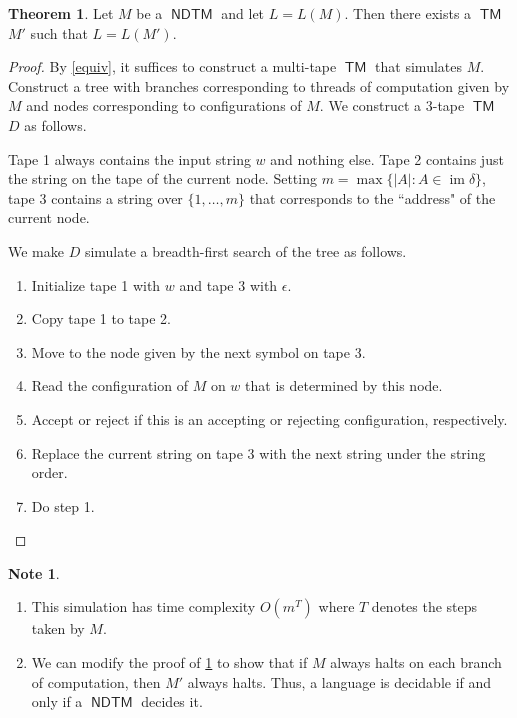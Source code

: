\documentclass[10pt,letterpaper,cm]{nupset}
\theoremstyle{definition}
\newtheorem{note}[definition]{Note}
\theoremstyle{theorem}
\newtheorem{theorem}[definition]{Theorem}
\theoremstyle{remark}
\newcommand{\1}{\mathbf{1}}
\newcommand{\0}{\vec 0}
\DeclareMathOperator{\im}{im}
\DeclareMathOperator{\TM}{\mathsf{TM}}
\DeclareMathOperator{\NDTM}{\mathsf{NDTM}}
\begin{document}
\begin{theorem}\label{LT}
Let $M$ be a $\NDTM$ and let $L = L(M)$. Then there exists a $\TM$ $M'$ such that $L= L(M')$. 
\end{theorem}
\begin{proof}
By \cref{equiv}, it suffices to construct a multi-tape $\TM$ that simulates $M$. Construct a tree with branches corresponding to threads of computation given by $M$ and nodes corresponding to configurations of $M$. We construct a $3$-tape $\TM$ $D$ as follows. 

\medskip

 Tape 1 always contains the input string $w$ and nothing else. Tape 2 contains just the string on the tape of the current node. Setting $m = \max\{ \lvert{A}\rvert : A \in \im{\delta} \}$, tape 3 contains a string over $\{1, \ldots, m\}$ that corresponds to the ``address" of the current node. 

\medskip

 We make $D$ simulate a breadth-first search of the tree as follows. 
\begin{enumerate}
\item Initialize  tape 1 with $w$ and tape $3$ with $\epsilon$. 
\item Copy tape 1 to tape 2.
\item Move to the node given by the next symbol on tape 3.
\item Read the configuration of $M$ on $w$ that is determined by this node.
\item Accept or reject if this is an accepting or rejecting configuration, respectively. 
\item Replace the current string on tape 3 with the next string under the string order.
\item Do step 1.
\end{enumerate}
\end{proof}

\begin{note} $ $
\begin{enumerate}
\item This simulation has time complexity $O(m^T)$ where $T$ denotes the steps taken by $M$.
\item We can modify the proof of \cref{LT} to show that if $M$ always halts on each branch of computation, then $M'$ always halts. Thus, a language is decidable if and only if a $\NDTM$ decides it.
\end{enumerate}
\end{note}
\end{document}
